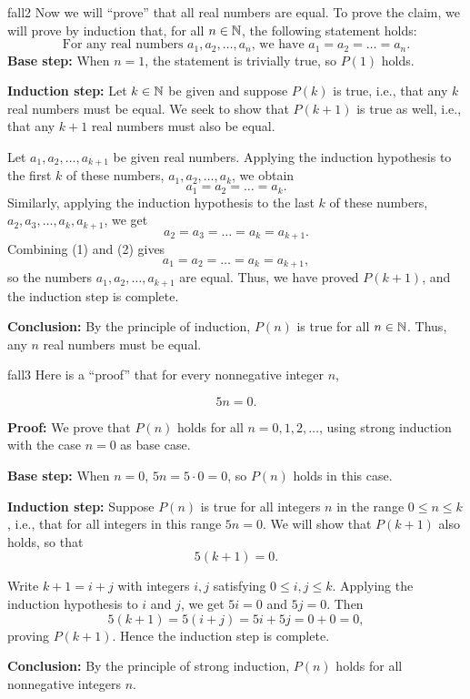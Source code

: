\begin{example}{fall2}
Now we will ``prove'' that all real numbers are equal. To prove the claim, we will prove by induction that, for all $n\in\mathbb{N}$,
the following statement holds:
\[
\text{For any real numbers $a_1,a_2,\dots, a_n$, we have $a_1=a_2=\dots=a_n$.}
\tag{$P(n)$}
\]
\textbf{Base step:} When $n=1$, the statement is trivially true, so $P(1)$
holds.  

\textbf{Induction step:} 
Let $k\in\mathbb{N}$ be given and suppose 
$P(k)$ is true, i.e., that any $k$ real numbers must be equal.
We seek to show that $P(k+1)$  is true as well,
i.e., that any $k+1$ real numbers must also be equal.

Let $a_1,a_2,\dots,a_{k+1}$ be given real numbers.  Applying the induction
hypothesis to the first $k$ of these numbers, $a_1,a_2,\dots,a_k$, we obtain
\[
\tag{1}
a_1=a_2=\dots=a_k.
\]
Similarly, applying the induction hypothesis to the last $k$ of these numbers, 
$a_2,a_3,\dots,a_k,a_{k+1}$, we get
\[
\tag{2}
a_2=a_3=\dots=a_k=a_{k+1}.
\]
Combining (1) and (2) gives
\[
\tag{3}
a_1=a_2=\dots=a_k=a_{k+1},
\]
so the numbers $a_1,a_2,\dots,a_{k+1}$ are equal.
Thus, we have proved $P(k+1)$, and the induction step is complete. 

\textbf{Conclusion:} By the principle of induction, 
$P(n)$  is true for all $n\in\mathbb{N}$. Thus, any $n$ real numbers must be equal.
\end{example}

%


\begin{example}{fall3} 
Here is a ``proof'' that for every nonnegative integer $n$, 

\[ \tag{$P(n)$} 5n=0.  \]

\textbf{Proof:} We prove that $P(n)$ holds for all $n=0,1,2,\dots$, using
strong induction with the case $n=0$ as base case.

\textbf{Base step:} When $n=0$, $5n=5\cdot0=0$, so $P(n)$ holds in this case.

\textbf{Induction step:} 
Suppose $P(n)$ is true for all integers $n$ in the range $0\le n\le k$, i.e.,
that for all integers in this range $5n=0$.  We will show that $P(k+1)$ also holds, so that
\[ \tag{$P(k+1)$} 5(k+1)=0.  \]

Write $k+1=i+j$ with integers $i,j$ satisfying $0\le i,j\le k$. 
Applying the induction hypothesis to $i$ and $j$, we get $5i=0$ and $5j=0$.
Then
\[
5(k+1)=5(i+j)=5i+5j=0+0=0,
\]
proving $P(k+1)$.  Hence the induction step is complete.

\textbf{Conclusion:} By the principle of strong induction, $P(n)$ holds for all
nonnegative integers $n$.
\end{example}


